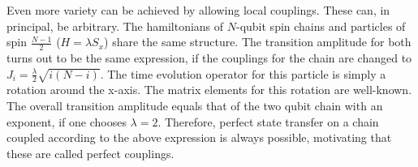 
\begin{center}
\end{center}

\noindent Even more variety can be achieved by allowing local couplings. These can, in principal, be arbitrary. The hamiltonians of $N$-qubit spin chains and particles of spin $\frac{N-1}{2}$ ($H = \lambda S_x$) share the same structure. The transition amplitude for both turns out to be the same expression, if the couplings for the chain are changed to $J_i = \frac{\lambda}{2}\sqrt{i(N-i)}$\cite{Christandl2004}. The time evolution operator for this particle is simply a rotation around the x-axis. The matrix elements for this rotation are well-known\cite{FeynmanVol31965}. The overall transition amplitude equals that of the two qubit chain with an exponent, if one chooses $\lambda = 2$. Therefore, perfect state transfer on a chain coupled according to the above expression is always possible, motivating that these are called perfect couplings.

